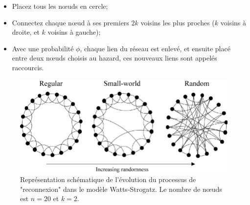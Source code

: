  \begin{itemize}
 	\item Placez tous les nœuds en cercle;
 	\item Connectez chaque nœud à ses premiers $2k$ voisins les plus proches ($k$ voisins à droite, et $k$ voisins à gauche);
 	\item  Avec une probabilité $\phi$, chaque lien du réseau est enlevé, et ensuite placé entre deux nœuds choisis au hazard, ces nouveaux liens sont appelés raccourcis.
 \end{itemize}
 \begin{figure}[h!]
 	\centering
 	\includegraphics[scale=0.45]{./figures/fig-SW3}
 	\caption{Représentation schématique de l'évolution du processus de "reconnexion" dans le modèle Watts-Strogatz. Le nombre de nœuds est $n=20$ et $k=2$.}  	
 	\label{SW1}
 \end{figure}
 
